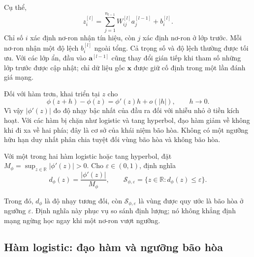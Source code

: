 Cụ thể,
\begin{equation}
 z_i^{[l]}=\sum_{j=1}^{n_{l-1}}W_{ij}^{[l]}a_j^{[l-1]}+b_i^{[l]}.
 \label{kt:eq:neuron}
\end{equation}
Chỉ số $i$ xác định nơ-ron nhận tín hiệu, còn $j$ xác định nơ-ron
ở lớp trước. Mỗi nơ-ron nhận một độ lệch $b_i^{[l]}$ ngoài tổng.
Cả trọng số và độ lệch thường được tối ưu. Với các lớp ẩn, đầu vào
$\mathbf a^{[l-1]}$ cũng thay đổi gián tiếp khi tham số những lớp
trước được cập nhật; chỉ dữ liệu gốc $\mathbf x$ được giữ cố định
trong một lần đánh giá mạng.

Đối với hàm trơn, khai triển tại $z$ cho
\begin{equation}
 \phi(z+h)-\phi(z)=\phi'(z)h+o(|h|),\qquad h\to0.
 \label{kt:eq:local-sensitivity}
\end{equation}
Vì vậy $|\phi'(z)|$ đo độ nhạy bậc nhất của đầu ra đối với nhiễu
nhỏ ở tiền kích hoạt. Với các hàm bị chặn như logistic và tang
hyperbol, đạo hàm giảm về không khi đi xa về hai phía; đây là
cơ sở của khái niệm bão hòa. Không có một ngưỡng hữu hạn duy nhất
phân chia tuyệt đối vùng bão hòa và không bão hòa.

\begin{definition}
Với một trong hai hàm logistic hoặc tang hyperbol, đặt
$M_\phi=\sup_{z\in\mathbb R}|\phi'(z)|>0$. Cho
$\varepsilon\in(0,1)$, định nghĩa
\begin{equation}
 d_\phi(z)=\frac{|\phi'(z)|}{M_\phi},\qquad
 \mathcal S_{\phi,\varepsilon}
   =\{z\in\mathbb R:d_\phi(z)\leq\varepsilon\}.
 \label{kt:eq:saturation-set}
\end{equation}
\end{definition}
Trong đó, $d_\phi$ là độ nhạy tương đối, còn
$\mathcal S_{\phi,\varepsilon}$ là vùng được quy ước là bão hòa ở
ngưỡng $\varepsilon$. Định nghĩa này phục vụ so sánh định lượng;
nó không khẳng định mạng ngừng học ngay khi một nơ-ron vượt ngưỡng.

\subsection{Hàm logistic: đạo hàm và ngưỡng bão hòa}

